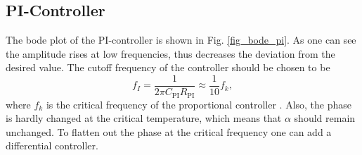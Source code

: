 \documentclass[a4paper,10pt]{article}
\begin{document}
\subsection{PI-Controller}
The bode plot of the PI-controller is shown in Fig. \ref{fig_bode_pi}. As one can see the amplitude rises at low frequencies, thus decreases the deviation from the desired value. The cutoff frequency of the controller should be chosen to be
\begin{equation}
  f_I = \frac{1}{2 \pi C_{\mathrm{PI}} R_{\mathrm{PI}}}\approx \frac{1}{10} f_k,
\end{equation}
where $f_k$ is the critical frequency of the proportional controller \cite{halbleiter}. Also, the phase is hardly changed at the critical temperature, which means that $\alpha$ should remain unchanged. To flatten out the phase at the critical frequency one can add a differential controller.
\end{document}
